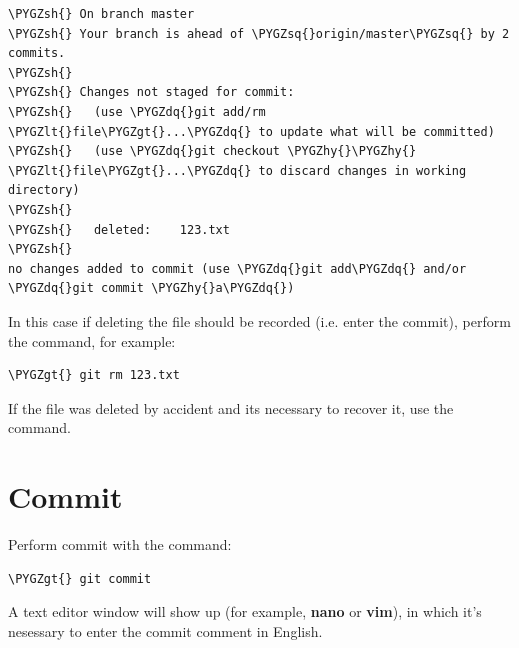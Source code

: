 \documentclass[a4paper,12pt,oneside]{sphinxmanual}
\def\PYGZlt{\char`\<}
\def\PYGZgt{\char`\>}
\def\PYGZsh{\char`\#}
\def\PYGZhy{\char`\-}
\def\PYGZsq{\char`\'}
\def\PYGZdq{\char`\"}
\begin{document}
\begin{Verbatim}[commandchars=\\\{\}]
\PYGZsh{} On branch master
\PYGZsh{} Your branch is ahead of \PYGZsq{}origin/master\PYGZsq{} by 2 commits.
\PYGZsh{}
\PYGZsh{} Changes not staged for commit:
\PYGZsh{}   (use \PYGZdq{}git add/rm \PYGZlt{}file\PYGZgt{}...\PYGZdq{} to update what will be committed)
\PYGZsh{}   (use \PYGZdq{}git checkout \PYGZhy{}\PYGZhy{} \PYGZlt{}file\PYGZgt{}...\PYGZdq{} to discard changes in working directory)
\PYGZsh{}
\PYGZsh{}   deleted:    123.txt
\PYGZsh{}
no changes added to commit (use \PYGZdq{}git add\PYGZdq{} and/or \PYGZdq{}git commit \PYGZhy{}a\PYGZdq{})
\end{Verbatim}

In this case if deleting the file should be recorded (i.e. enter the commit), perform the  command, for example:

\begin{Verbatim}[commandchars=\\\{\}]
\PYGZgt{} git rm 123.txt
\end{Verbatim}

If the file was deleted by accident and its necessary to recover it, use the  command.


\section{Commit}
\label{git_short_manual:git-commit}\label{git_short_manual:index-5}\label{git_short_manual:id12}
Perform commit with the command:

\begin{Verbatim}[commandchars=\\\{\}]
\PYGZgt{} git commit
\end{Verbatim}

A text editor window will show up (for example, \textbf{nano} or \textbf{vim}), in which it's nesessary to enter the commit comment in English.
\end{document}
